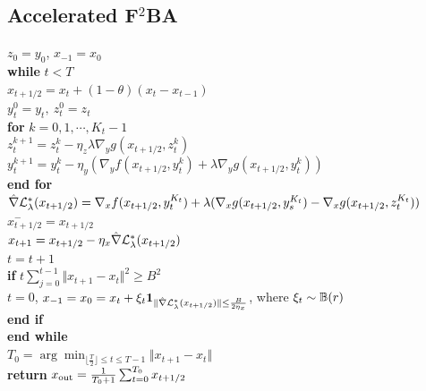 \documentclass[twoside,11pt]{article}
\begin{document}
{\subsection{Accelerated F${}^2$BA}

\begin{algorithm*}[t]  
\caption{Accelerated F${}^2$BA$(x_0,y_0)$} \label{alg:AccF2BA}
\begin{algorithmic}[1] 
\STATE $ z_0 = y_0$, $x_{-1} = x_0$ \\[1mm]
\STATE \textbf{while} $ t < T $ \\[1mm]
\STATE \quad $x_{t+1/2} = x_t + (1-\theta) (x_t -x_{t-1})$ \\[1mm]
\STATE \quad $ y_t^0 =  y_{t}, ~ z_t^0 = z_{t}$ \\[1mm]
\STATE \quad \textbf{for} $ k =0,1,\cdots,K_t-1$ \\[1mm]
\STATE \quad \quad $ z_t^{k+1} = z_t^{k}- \eta_z \lambda \nabla_y g(x_{t+1/2}, z_t^k)   $ \\[1mm]
\STATE \quad \quad $ y_t^{k+1} = y_t^k - \eta_y \left( \nabla_y f(x_{t+1/2},y_t^k) +  \lambda  \nabla_y g(x_{t+1/2},y_t^k) \right)$ \\[1mm]
\STATE \quad \textbf{end for} \\[1mm]
\STATE \quad $ \hat \nabla {\mathcal{L}}_{\lambda}^*(x_{t+1/2})= \nabla_x f(x_{t+1/2},y_{t}^{K_t}) + \lambda ( \nabla_x g(x_{t+1/2},y_{s}^{K_t}) - \nabla_x g(x_{t+1/2},z_{t}^{K_t}) )$ \\[1mm]
\STATE \quad $x_{t+1/2}^- = x_{t+1/2}$ \\[1mm]
\STATE\quad  $x_{t+1} = x_{t+1/2} - \eta_x \hat \nabla {\mathcal{L}}_{\lambda}^*(x_{t+1/2}) $ \\[1mm]
\STATE \quad $ t = t+1 $ \\ [1mm]
\STATE \quad \textbf{if} $ t \sum_{j=0}^{t-1} \Vert x_{t+1} - x_t \Vert^2 \ge B^2$ \\[1mm]
\STATE \quad \quad $t=0$, $x_{-1} = x_0 = x_t + \xi_t {\bf{1}}_{ \Vert \hat \nabla {\mathcal{L}}_{\lambda}^*(x_{t+1/2}) \Vert \le \frac{B}{2 \eta_x} }$, {\rm where} $\xi_t \sim {\mathbb{B}}(r)$  \\[1mm] 
\STATE \quad \textbf{end if} \\[1mm]
\STATE \textbf{end while} \\[1mm]
\STATE $T_0 = \arg \min_{\lfloor \frac{T}{2} \rfloor \le t \le T-1} \Vert x_{t+1} - x_t \Vert$ \\[1mm]
\STATE \textbf{return} $x_{\rm out} = \frac{1}{T_0+1} \sum_{t=0}^{T_0} x_{t+1/2}$ \\[1mm]
\end{algorithmic}
\end{algorithm*}
}
\end{document}
